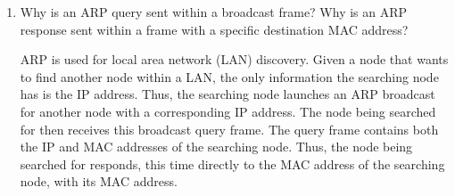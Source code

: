 \begin{enumerate}
    \item Why is an ARP query sent within a broadcast frame? Why is an ARP response sent within a frame with a specific destination MAC address?

      ARP is used for local area network (LAN) discovery. Given a node that wants to find another node within a LAN, the only information the searching node has is the IP address. Thus, the searching node launches an ARP broadcast for another node with a corresponding IP address. The node being searched for then receives this broadcast query frame. The query frame contains both the IP and MAC addresses of the searching node. Thus, the node being searched for responds, this time directly to the MAC address of the searching node, with its MAC address.

\end{enumerate}



